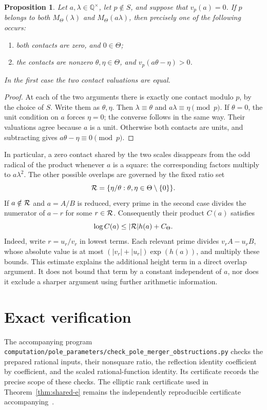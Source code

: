 \documentclass[11pt,a4paper]{article}
\newtheorem{proposition}[theorem]{Proposition}
\newcommand{\Q}{\mathbb Q}
\begin{document}
\begin{proposition}\label{prop:collisions}
Let $a,\lambda\in\Q^\times$, let $p\notin S$, and suppose that
$v_p(a)=0$. If $p$ belongs to both $M_\Theta(\lambda)$ and
$M_\Theta(a\lambda)$, then precisely one of the following occurs:
\begin{enumerate}
\item both contacts are zero, and $0\in\Theta$;
\item the contacts are nonzero $\theta,\eta\in\Theta$, and
      $v_p(a\theta-\eta)>0$.
\end{enumerate}
In the first case the two contact valuations are equal.
\end{proposition}
\begin{proof}
At each of the two arguments there is exactly one contact modulo
$p$, by the choice of $S$. Write them as $\theta,\eta$.
Then $\lambda\equiv\theta$ and $a\lambda\equiv\eta\pmod p$.
If $\theta=0$, the unit condition on $a$ forces $\eta=0$;
the converse follows in the same way. Their valuations agree
because $a$ is a unit. Otherwise both contacts are units, and
subtracting gives $a\theta-\eta\equiv0\pmod p$.
\end{proof}

In particular, a zero contact shared by the two scales disappears
from the odd radical of the product whenever $a$ is a square:
the corresponding factors multiply to $a\lambda^2$.
The other possible overlaps are governed by the fixed ratio set
\[
 {\cal R}=\{\eta/\theta:\theta,\eta\in\Theta\setminus\{0\}\}.
\]
If $a\notin{\cal R}$ and $a=A/B$ is reduced, every prime in
the second case divides the numerator of $a-r$ for some
$r\in{\cal R}$. Consequently their product $C(a)$ satisfies
\[
                  \log C(a)\le |{\cal R}|h(a)+C_\Theta.
\]
Indeed, write $r=u_r/v_r$ in lowest terms. Each relevant prime
divides $v_rA-u_rB$, whose absolute value is at most
$(|v_r|+|u_r|)\exp(h(a))$, and multiply these bounds.
This estimate explains the additional height term in a direct
overlap argument. It does not bound that term by a constant
independent of $a$, nor does it exclude a sharper argument
using further arithmetic information.

\section*{Exact verification}

The accompanying program
\nolinkurl{computation/pole_parameters/check_pole_merger_obstructions.py}
checks the prepared rational inputs, their nonsquare ratio,
the reflection identity coefficient by coefficient, and the
scaled rational-function identity. Its certificate records the
precise scope of these checks. The elliptic rank certificate
used in Theorem~\ref{thm:shared-e} remains the independently
reproducible certificate accompanying~\cite{Fixed}.
\end{document}
